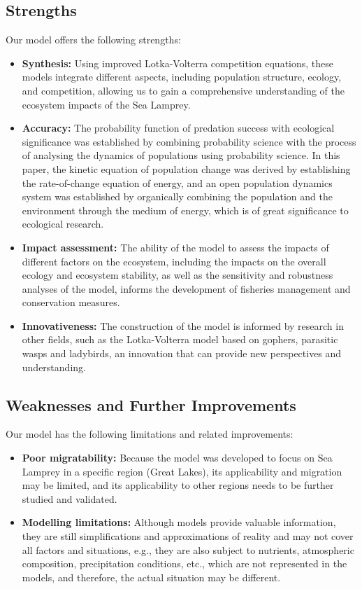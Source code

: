 \documentclass{mcmthesis}
\begin{document}
\subsection{Strengths}
Our model offers the following strengths:
\begin{itemize}
  \item \textbf{Synthesis:} Using improved Lotka-Volterra competition equations, 
  these models integrate different aspects, including population structure, ecology, and competition, 
  allowing us to gain a comprehensive understanding of the ecosystem impacts of the Sea Lamprey.
  \item \textbf{Accuracy:} The probability function of predation success with ecological significance 
  was established by combining probability science with the process of analysing the dynamics of populations 
  using probability science. In this paper, the kinetic equation of population change was derived 
  by establishing the rate-of-change equation of energy, and an open population dynamics system was established 
  by organically combining the population and the environment through the medium of energy, 
  which is of great significance to ecological research.
  \item \textbf{Impact assessment:} The ability of the model to assess the impacts of different factors on the ecosystem, 
  including the impacts on the overall ecology and ecosystem stability, 
  as well as the sensitivity and robustness analyses of the model, 
  informs the development of fisheries management and conservation measures.
  \item \textbf{Innovativeness:} The construction of the model is informed by research in other fields, 
  such as the Lotka-Volterra model based on gophers, 
  parasitic wasps and ladybirds, an innovation that can provide new perspectives and understanding.
\end{itemize}

\subsection{Weaknesses and Further Improvements}
Our model has the following limitations and related improvements:
\begin{itemize}
  \item \textbf{Poor migratability:} Because the model was developed to focus on Sea Lamprey in a specific region (Great Lakes), 
  its applicability and migration may be limited, and its applicability to other regions needs to be further studied and validated.
  \item \textbf{Modelling limitations:} Although models provide valuable information, 
  they are still simplifications and approximations of reality and may not cover all factors and situations, e.g., 
  they are also subject to nutrients, atmospheric composition, precipitation conditions, etc., 
  which are not represented in the models, and therefore, the actual situation may be different.
\end{itemize}
\end{document}
